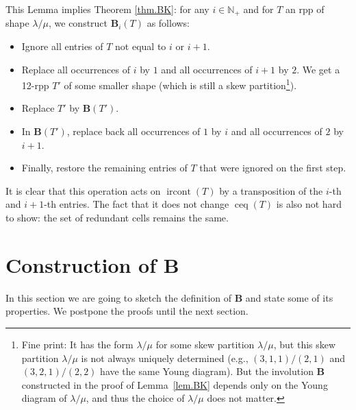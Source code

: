 \documentclass[numbers=enddot,12pt,final,onecolumn,notitlepage]{scrartcl}%
\theoremstyle{definition}
\newcommand{\Nplus}{\mathbb{N}_{+}}
\def\ceq{{\operatorname{ceq}}}
\def\ircont{{\operatorname{ircont}}}
\def\lm{{\lambda/\mu}}
\def\B{{\mathbf{B}}}
\begin{document}
 This Lemma implies Theorem \ref{thm.BK}: for any $i\in\Nplus$ and for $T$ an rpp of shape $\lm$, we construct $\B_i(T)$ as follows: 
 \begin{itemize}
  \item Ignore all entries of $T$ not equal to $i$ or $i+1$. 
  \item Replace all occurrences of $i$ by $1$ and all occurrences of $i+1$ by $2$. We get a 12-rpp $T'$ of some smaller shape (which is still a skew partition\footnote{Fine print: It has the form $\lm$ for some skew partition $\lm$, but this skew partition $\lm$ is not always uniquely determined (e.g., $\left(3,1,1\right)/\left(2,1\right)$ and $\left(3,2,1\right)/\left(2,2\right)$ have the same Young diagram). But the involution $\mathbf{B}$ constructed in the proof of Lemma~\ref{lem.BK} depends only on the Young diagram of $\lm$, and thus the choice of $\lm$ does not matter.}).
  \item Replace $T'$ by $\B(T')$.
  \item In $\B(T')$, replace back all occurrences of $1$ by $i$ and all occurrences of $2$ by $i+1$.
  \item Finally, restore the remaining entries of $T$ that were ignored on the first step.
 \end{itemize}
 
 It is clear that this operation acts on $\ircont(T)$ by a transposition of the $i$-th and $i+1$-th entries. The fact that it does not change $\ceq(T)$ is also not hard to show: the set of redundant cells remains the same.

\def\B{{\mathbf{B}}}

\section{Construction of $\mathbf{B}$\label{sect.construction}}

In this section we are going to sketch the definition of $\mathbf{B}$ and state some of its properties. We postpone the proofs until the next section.
\end{document}
